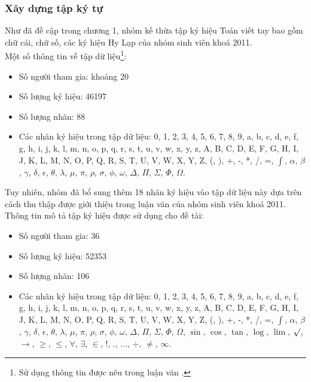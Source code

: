 \documentclass[a4paper,12pt]{article}
\begin{document}
	\subsubsection{Xây dựng tập ký tự}
	Như đã đề cập trong chương 1, nhóm kế thừa tập ký hiệu Toán viết tay bao gồm chữ cái, chữ số, các ký hiệu Hy Lạp của nhóm sinh viên khoá 2011\cite{qak}.\\
	Một số thông tin về tập dữ liệu\footnote{Sử dụng thông tin được nêu trong luận văn \cite{qak}.}:
	\begin{itemize}
		\item Số người tham gia: khoảng 20
		\item Số lượng ký hiệu: 46197
		\item Số lượng nhãn: 88
		\item Các nhãn ký hiệu trong tập dữ liệu: 0, 1, 2, 3, 4, 5, 6, 7, 8, 9, a, b, c, d, e, f, g, h, i,
		j, k, l, m, n, o, p, q, r, s, t, u, v, w, x, y, z, A, B, C, D, E, F, G, H, I, J, K, L, M, N, O, P, Q, R, S, T, U, V, W, X, Y, Z, (, ), +, -, *, /, =, $\int$, $\alpha$, $\beta$, $\gamma$, $\delta$, $\epsilon$, $\theta$, $\lambda$, $\mu$, $\pi$, $\rho$, $\sigma$, $\phi$, $\omega$, $\Delta$, $\Pi$, $\Sigma$, $\Phi$, $\Omega$.
	\end{itemize}
	Tuy nhiên, nhóm đã bổ sung thêm 18 nhãn ký hiệu vào tập dữ liệu này dựa trên cách thu thập được giới thiệu trong luận văn của nhóm sinh viên khoá 2011\cite{qak}.\\
	Thông tin mô tả tập ký hiệu được sử dụng cho đề tài:
	\begin{itemize}
		\item Số người tham gia: 36
		\item Số lượng ký hiệu: 52353
		\item Số lượng nhãn: 106
		\item Các nhãn ký hiệu trong tập dữ liệu: 0, 1, 2, 3, 4, 5, 6, 7, 8, 9, a, b, c, d, e, f, g, h, i, j, k, l, m, n, o, p, q, r, s, t, u, v, w, x, y, z, A, B, C, D, E, F, G, H, I, J, K, L, M, N, O, P, Q, R, S, T, U, V, W, X, Y, Z, (, ), +, -, *, /, =, $\int$, $\alpha$, $\beta$, $\gamma$, $\delta$, $\epsilon$, $\theta$, $\lambda$, $\mu$, $\pi$, $\rho$, $\sigma$, $\phi$, $\omega$, $\Delta$, $\Pi$, $\Sigma$, $\Phi$, $\Omega$, $\sin$, $\cos$, $\tan$, $\log$, $\lim$, $\surd$, $\rightarrow$, $\geq$, $\leq$, $\forall$, $\exists$, $\in$, !, ., $\ldots$, $\div$, $\neq$, $\infty$.
		
	\end{itemize}
\end{document}
